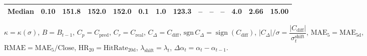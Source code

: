 \begin{threeparttable}
{\begin{tabular}{lrrrrrrrrrrrrr}
 Median &     0.10 & 151.8 & 152.0 & 152.0 &        0.1 &                      1.0 &               123.3 &         -- &        -- &             -- &              4.0 &            2.66 &                  15.00 \\
\bottomrule
\end{tabular}
}%
\begin{tablenotes}\footnotesize
\item $\kappa=\kappa(\sigma)$, $B=B_{t-1}$, $C_p=C_{\text{pred}}$, $C_r=C_{\text{real}}$, $C_\Delta=C_{\text{diff}}$, $\mathrm{sgn}\,C_\Delta=\operatorname{sign}(C_{\text{diff}})$, $|C_\Delta|/\sigma=\dfrac{|C_{\text{diff}}|}{\sigma_t^{\text{shift}}}$, $\mathrm{MAE}_5=\mathrm{MAE}_{5\text{d}}$, $\mathrm{RMAE}= \mathrm{MAE}_5 / \text{Close}$, $\mathrm{HR}_{20}=\mathrm{HitRate}_{20\text{d}}$, 
$\lambda_{\text{shift}}=\lambda_t$, 
$\Delta\alpha_t=\alpha_t-\alpha_{t-1}$.
\end{tablenotes}
\end{threeparttable}
\endgroup
